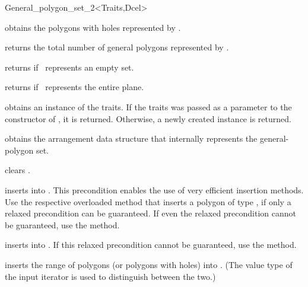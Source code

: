 \begin{ccRefClass}{General_polygon_set_2<Traits,Dcel>}
\ccAccessFunctions
\ccThreeToTwo

  {obtains the polygons with holes represented by \ccVar.}
  
  {returns the total number of general polygons represented by \ccVar.}

  {returns  if \ccVar\ represents an empty set.}

  {returns  if \ccVar\ represents the entire plane.}

  {obtains an instance of the traits. If the traits was passed as a
  parameter to the constructor of \ccVar, it is returned. Otherwise, a
  newly created instance is returned.}

  {obtains the arrangement data structure that internally represents the
  general-polygon set.}

\ccModifiers
\ccThreeToTwo

  {clears \ccVar.}

  {inserts  into \ccVar.
   This precondition enables the use of very efficient insertion methods.
   Use the respective overloaded method that inserts a polygon of type 
   , if only a relaxed
   precondition can be guaranteed. If even the relaxed precondition cannot
   be guaranteed, use the  method.}

  {inserts  into \ccVar.
   If this relaxed precondition cannot be guaranteed, use the  
   method.}

  {inserts the range of polygons (or polygons with holes) into \ccVar. (The
   value type of the input iterator is used to distinguish between the two.)
   }


\end{ccRefClass}
